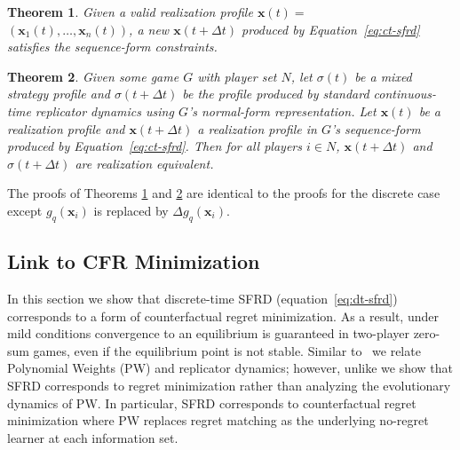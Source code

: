 \documentclass{aamas2014}
\newcommand{\bx}{\mathbf{x}}
\newtheorem{theorem}{Theorem}
\begin{document}
\begin{theorem}
\label{thm:ct-constraints}
Given a valid realization profile $\bx(t) = $\\ $(\bx_1(t), \ldots, \bx_n(t))$, a new $\bx(t + \Delta t)$ produced by
Equation~\ref{eq:ct-sfrd} satisfies the sequence-form constraints. 
\end{theorem}

\begin{theorem}
\label{thm:ct-releq}
Given some game $G$ with player set $N$, 
let $\sigma(t)$ be a mixed strategy profile and $\sigma(t + \Delta t)$ be the profile produced by 
standard continuous-time replicator dynamics using $G$'s normal-form representation. 
Let $\bx(t)$ be a realization profile and $\bx(t + \Delta t)$ a realization profile in $G$'s sequence-form produced by 
Equation~\ref{eq:ct-sfrd}. Then for all players $i \in N$, $\bx(t+\Delta t)$ and $\sigma(t + \Delta t)$ are realization equivalent.
\end{theorem}

The proofs of Theorems \ref{thm:ct-constraints} and \ref{thm:ct-releq} are identical to the proofs for the discrete case 
except $g_q(\bx_i)$ is replaced by $\Delta g_q(\bx_i)$.

\subsection{Link to CFR Minimization}

In this section we show that discrete-time SFRD (equation~\ref{eq:dt-sfrd}) corresponds to a form of counterfactual 
regret minimization. As a result, under mild conditions convergence to an equilibrium is guaranteed 
in two-player zero-sum games, even if the equilibrium point is not stable. 
Similar to~\cite{Klos10Evolutionary} we relate Polynomial Weights (PW) and replicator dynamics; 
however, unlike \cite{Klos10Evolutionary} we show that SFRD corresponds to regret minimization rather than analyzing the 
evolutionary dynamics of PW. 
In particular, SFRD corresponds to counterfactual regret minimization where PW replaces 
regret matching as the underlying no-regret learner at each information set. 
\end{document}
